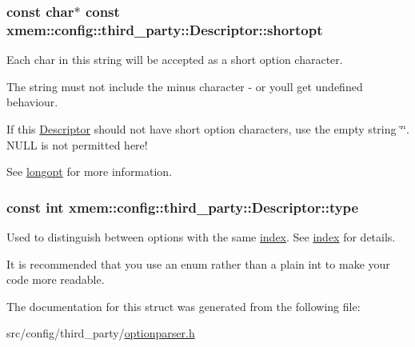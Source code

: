 \subsubsection[{shortopt}]{\setlength{\rightskip}{0pt plus 5cm}const char$\ast$ const xmem\+::config\+::third\+\_\+party\+::\+Descriptor\+::shortopt}\label{structxmem_1_1config_1_1third__party_1_1_descriptor_ac2dfb6bb8ca2f4aabf964a910cf0d59b}


Each char in this string will be accepted as a short option character. 

The string must not include the minus character {\ttfamily \textquotesingle{}-\/\textquotesingle{}} or you\textquotesingle{}ll get undefined behaviour.

If this \hyperlink{structxmem_1_1config_1_1third__party_1_1_descriptor}{Descriptor} should not have short option characters, use the empty string \char`\"{}\char`\"{}. N\+U\+L\+L is not permitted here!

See \hyperlink{structxmem_1_1config_1_1third__party_1_1_descriptor_a7246a4bfc669f68bb406dece398be7bb}{longopt} for more information. \hypertarget{structxmem_1_1config_1_1third__party_1_1_descriptor_a4b9e9a5c9b08ef575ea4f603c54bff63}{}
\subsubsection[{type}]{\setlength{\rightskip}{0pt plus 5cm}const int xmem\+::config\+::third\+\_\+party\+::\+Descriptor\+::type}\label{structxmem_1_1config_1_1third__party_1_1_descriptor_a4b9e9a5c9b08ef575ea4f603c54bff63}


Used to distinguish between options with the same \hyperlink{structxmem_1_1config_1_1third__party_1_1_descriptor_aacf3d44f35c61f22be65da078f60734b}{index}. See \hyperlink{structxmem_1_1config_1_1third__party_1_1_descriptor_aacf3d44f35c61f22be65da078f60734b}{index} for details. 

It is recommended that you use an enum rather than a plain int to make your code more readable. 

The documentation for this struct was generated from the following file\+:\begin{DoxyCompactItemize}
\item 
src/config/third\+\_\+party/\hyperlink{optionparser_8h}{optionparser.\+h}\end{DoxyCompactItemize}
